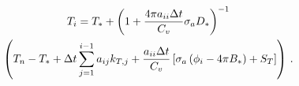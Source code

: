 \begin{multline}
T_i = T_* + \left(1 + \frac{4\pi a_{ii} \Delta t}{C_v} \sigma_a D_*  \right)^{-1} \\
\left( T_n - T_* + \Delta t \sum_{j=1}^{i-1}{a_{ij} k_{T,j}} +  \frac{a_{ii} \Delta t }{C_v} \left[ \sigma_a \left( \phi_i - 4\pi   B_* \right) + S_T \right]  \right) \, .
\label{eq:analytic_t_i}
\end{multline}

